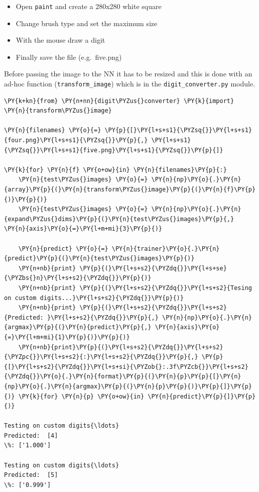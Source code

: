 \begin{itemize}
\tightlist
\item
  Open \texttt{paint} and create a 280x280 white square
\item
  Change brush type and set the maximum size
\item
  With the mouse draw a digit
\item
  Finally save the file (e.g.~five.png)
\end{itemize}

Before passing the image to the NN it has to be resized and this is done
with an ad-hoc function (\texttt{transform\_image}) which is in the
\texttt{digit\_converter.py} module.

    \begin{tcolorbox}[breakable, size=fbox, boxrule=1pt, pad at break*=1mm,colback=cellbackground, colframe=cellborder]
\begin{Verbatim}[commandchars=\\\{\}]
\PY{k+kn}{from} \PY{n+nn}{digit\PYZus{}converter} \PY{k}{import} \PY{n}{transform\PYZus{}image}

\PY{n}{filenames} \PY{o}{=} \PY{p}{[}\PY{l+s+s1}{\PYZsq{}}\PY{l+s+s1}{four.png}\PY{l+s+s1}{\PYZsq{}}\PY{p}{,} \PY{l+s+s1}{\PYZsq{}}\PY{l+s+s1}{five.png}\PY{l+s+s1}{\PYZsq{}}\PY{p}{]}

\PY{k}{for} \PY{n}{f} \PY{o+ow}{in} \PY{n}{filenames}\PY{p}{:}
    \PY{n}{test\PYZus{}images} \PY{o}{=} \PY{n}{np}\PY{o}{.}\PY{n}{array}\PY{p}{(}\PY{n}{transform\PYZus{}image}\PY{p}{(}\PY{n}{f}\PY{p}{)}\PY{p}{)}
    \PY{n}{test\PYZus{}images} \PY{o}{=} \PY{n}{np}\PY{o}{.}\PY{n}{expand\PYZus{}dims}\PY{p}{(}\PY{n}{test\PYZus{}images}\PY{p}{,} \PY{n}{axis}\PY{o}{=}\PY{l+m+mi}{3}\PY{p}{)}

    \PY{n}{predict} \PY{o}{=} \PY{n}{trainer}\PY{o}{.}\PY{n}{predict}\PY{p}{(}\PY{n}{test\PYZus{}images}\PY{p}{)}
    \PY{n+nb}{print} \PY{p}{(}\PY{l+s+s2}{\PYZdq{}}\PY{l+s+se}{\PYZbs{}n}\PY{l+s+s2}{\PYZdq{}}\PY{p}{)}
    \PY{n+nb}{print} \PY{p}{(}\PY{l+s+s2}{\PYZdq{}}\PY{l+s+s2}{Tesing on custom digits...}\PY{l+s+s2}{\PYZdq{}}\PY{p}{)}
    \PY{n+nb}{print} \PY{p}{(}\PY{l+s+s2}{\PYZdq{}}\PY{l+s+s2}{Predicted: }\PY{l+s+s2}{\PYZdq{}}\PY{p}{,} \PY{n}{np}\PY{o}{.}\PY{n}{argmax}\PY{p}{(}\PY{n}{predict}\PY{p}{,} \PY{n}{axis}\PY{o}{=}\PY{l+m+mi}{1}\PY{p}{)}\PY{p}{)}
    \PY{n+nb}{print}\PY{p}{(}\PY{l+s+s2}{\PYZdq{}}\PY{l+s+s2}{\PYZpc{}}\PY{l+s+s2}{:}\PY{l+s+s2}{\PYZdq{}}\PY{p}{,} \PY{p}{[}\PY{l+s+s2}{\PYZdq{}}\PY{l+s+si}{\PYZob{}:.3f\PYZcb{}}\PY{l+s+s2}{\PYZdq{}}\PY{o}{.}\PY{n}{format}\PY{p}{(}\PY{n}{p}\PY{p}{[}\PY{n}{np}\PY{o}{.}\PY{n}{argmax}\PY{p}{(}\PY{n}{p}\PY{p}{)}\PY{p}{]}\PY{p}{)} \PY{k}{for} \PY{n}{p} \PY{o+ow}{in} \PY{n}{predict}\PY{p}{]}\PY{p}{)}
      
Testing on custom digits{\ldots}
Predicted:  [4]
\%: ['1.000']

Testing on custom digits{\ldots}
Predicted:  [5]
\%: ['0.999']
    \end{Verbatim}
\end{tcolorbox}

